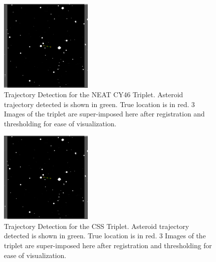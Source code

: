 \begin{figure}[h]
\vspace{-0.7cm}
\begin{center}
\includegraphics[width=0.4\textwidth]{Figures/NEATLines_LogicalImg.pdf}
\end{center}
\vspace{-0.7cm}
\caption{Trajectory Detection for the NEAT CY46 Triplet. Asteroid trajectory detected is shown in green. True location is in red. 3 Images of the triplet are super-imposed here after registration and thresholding for ease of visualization.}
\label{fig:IPP_NEAT_Trajectory}
\vspace{-0.3cm}
\end{figure}

\begin{figure}[h]
\vspace{-0.7cm}
\begin{center}
\includegraphics[width=0.4\textwidth]{Figures/NEATLines_LogicalImg.pdf}
\end{center}
\vspace{-0.7cm}
\caption{Trajectory Detection for the CSS Triplet. Asteroid trajectory detected is shown in green. True location is in red. 3 Images of the triplet are super-imposed here after registration and thresholding for ease of visualization.}
\label{fig:IPP_CSS_Trajectory}
\vspace{-0.3cm}
\end{figure}

